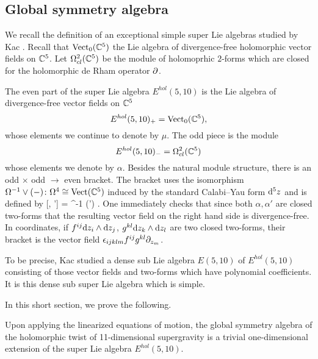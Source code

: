 \documentclass[11pt]{amsart}
\begin{document}

\subsection{Global symmetry algebra}

We recall the definition of an exceptional simple super Lie algebras studied by Kac \cite{KacClass,KR}. 
Recall that ${\rm Vect}_0 (\mathbb C^5)$ the Lie algebra of divergence-free holomorphic vector fields on $\mathbb C^5$.
Let $\Omega^{2}_{cl} (\mathbb C^5)$ be the module of holomoprhic $2$-forms which are closed for the holomorphic de Rham operator $\partial$.

The even part of the super Lie algebra $E^{hol}(5,10)$ is the Lie algebra of divergence-free vector fields on $\mathbb C^5$
\[
E^{hol}(5,10)_+ = {\rm Vect}_0(\mathbb C^5) ,
\]
whose elements we continue to denote by $\mu$. 
The odd piece is the module 
\[
E^{hol}(5,10)_- = \Omega^{2}_{cl} (\mathbb C^5) 
\]
whose elements we denote by $\alpha$. 
Besides the natural module structure, there is an odd $\times$ odd $\to$ even bracket. 
The bracket uses the isomorphism $\Omega^{-1} \vee (-) \colon \Omega^{4} \cong {\rm Vect} (\mathbb C^5)$ induced by the standard Calabi--Yau form ${\rm d}^5 z$ and is defined by
\beqn\label{eqn:e510}
[\alpha, \alpha'] = \Omega^{-1} \vee (\alpha \wedge \alpha') .
\eeqn
One immediately checks that since both $\alpha, \alpha'$ are closed two-forms that the resulting vector field on the right hand side is divergence-free. 
In coordinates, if $f^{ij} {\rm d} z_i \wedge {\rm d} z_j$, $g^{kl} {\rm d} z_k \wedge {\rm d} z_l$ are two closed two-forms, their bracket is the vector field $\epsilon_{ijklm} f^{ij}g^{kl} \partial_{z_m}$. 

To be precise, Kac studied a dense sub Lie algebra $E(5,10)$ of $E^{hol}(5,10)$ consisting of those vector fields and two-forms which have polynomial coefficients.
It is this dense sub super Lie algebra which is simple.

In this short section, we prove the following.

\begin{thm}\label{thm:global}
Upon applying the linearized equations of motion, the global symmetry algebra of the holomorphic twist of 11-dimensional supergravity is a trivial one-dimensional extension of the super Lie algebra $E^{hol}(5,10)$. 
\end{thm}
\end{document}
